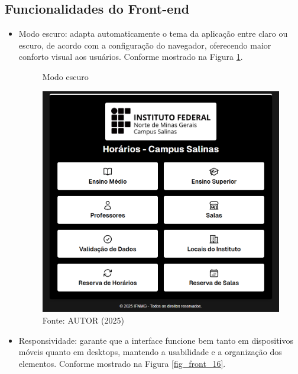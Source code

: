 \subsection{Funcionalidades do Front-end}

\begin{itemize}
    \item Modo escuro: adapta automaticamente o tema da aplicação entre claro ou escuro, de acordo com a configuração do navegador, oferecendo maior conforto visual aos usuários. Conforme mostrado na Figura \ref{fig_front_15}.

    \begin{figure}[htb]
        \centering
        \caption{Modo escuro}
        \includegraphics[width=1\textwidth]{Figuras/front-15.png}
        \caption*{Fonte: AUTOR (2025)}
        \label{fig_front_15}
    \end{figure}

    \item Responsividade: garante que a interface funcione bem tanto em dispositivos móveis quanto em desktops, mantendo a usabilidade e a organização dos elementos. Conforme mostrado na Figura \ref{fig_front_16}.


\end{itemize}
